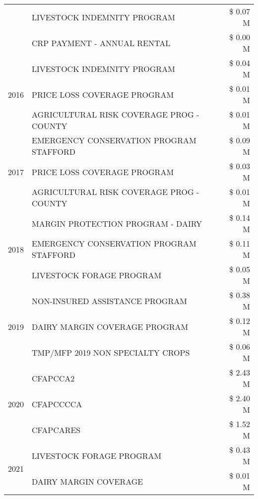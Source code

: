 \begin{tabular}{llr}
 & LIVESTOCK INDEMNITY PROGRAM & \$ 0.07 M \\
 & CRP PAYMENT - ANNUAL RENTAL & \$ 0.00 M \\
\cline{1-3}
\multirow[t]{3}{*}{2016} & LIVESTOCK INDEMNITY PROGRAM                   & \$ 0.04 M \\
 & PRICE LOSS COVERAGE PROGRAM                   & \$ 0.01 M \\
 & AGRICULTURAL RISK COVERAGE PROG - COUNTY      & \$ 0.01 M \\
\cline{1-3}
\multirow[t]{3}{*}{2017} & EMERGENCY CONSERVATION PROGRAM STAFFORD & \$ 0.09 M \\
 & PRICE LOSS COVERAGE PROGRAM & \$ 0.03 M \\
 & AGRICULTURAL RISK COVERAGE PROG - COUNTY & \$ 0.01 M \\
\cline{1-3}
\multirow[t]{3}{*}{2018} & MARGIN PROTECTION PROGRAM - DAIRY & \$ 0.14 M \\
 & EMERGENCY CONSERVATION PROGRAM STAFFORD & \$ 0.11 M \\
 & LIVESTOCK FORAGE PROGRAM & \$ 0.05 M \\
\cline{1-3}
\multirow[t]{3}{*}{2019} & NON-INSURED ASSISTANCE PROGRAM & \$ 0.38 M \\
 & DAIRY MARGIN COVERAGE PROGRAM & \$ 0.12 M \\
 & TMP/MFP 2019 NON SPECIALTY CROPS & \$ 0.06 M \\
\cline{1-3}
\multirow[t]{3}{*}{2020} & CFAPCCA2 & \$ 2.43 M \\
 & CFAPCCCCA & \$ 2.40 M \\
 & CFAPCARES & \$ 1.52 M \\
\cline{1-3}
\multirow[t]{2}{*}{2021} & LIVESTOCK FORAGE PROGRAM & \$ 0.43 M \\
 & DAIRY MARGIN COVERAGE & \$ 0.01 M \\
\cline{1-3}
\bottomrule
\end{tabular}
